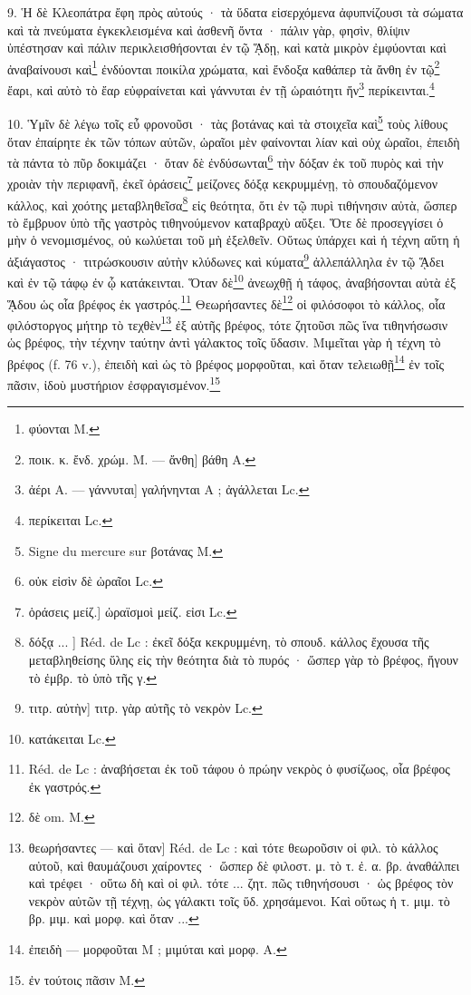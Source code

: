 \documentclass[a4paper, 11pt, oneside, polutonikogreek, french]{article}
\begin{document}
9. Ἡ δὲ Κλεοπάτρα ἔφη πρὸς αὐτούς · τὰ ὕδατα εἰσερχόμενα ἀφυπνίζουσι τὰ σώματα καὶ τὰ πνεύματα ἐγκεκλεισμένα καὶ ἀσθενῆ ὄντα · πάλιν γὰρ, φησὶν, θλίψιν ὑπέστησαν καὶ πάλιν περικλεισθήσονται ἐν τῷ ᾍδῃ, καὶ κατὰ μικρὸν ἐμφύονται καὶ ἀναβαίνουσι καὶ\footnote{φύονται M.} ἐνδύονται ποικίλα χρώματα, καὶ ἔνδοξα καθάπερ τὰ ἄνθη ἐν τῷ\footnote{ποικ. κ. ἔνδ. χρώμ. M. --- ἄνθη] βάθη A.} ἔαρι, καὶ αὐτὸ τὸ ἔαρ εὐφραίνεται καὶ γάννυται ἐν τῇ ὡραιότητι ἥν\footnote{ἀέρι A. --- γάννυται] γαλήνηνται A ; ἀγάλλεται Lc.} περίκεινται.\footnote{περίκειται Lc.}

10. Ὑμῖν δὲ λέγω τοῖς εὖ φρονοῦσι · τὰς βοτάνας καὶ τὰ στοιχεῖα καὶ\footnote{Signe du mercure sur βοτάνας M.} τοὺς λίθους ὅταν ἐπαίρητε ἐκ τῶν τόπων αὐτῶν, ὡραῖοι μὲν φαίνονται λίαν καὶ οὐχ ὡραῖοι, ἐπειδὴ τὰ πάντα τὸ πῦρ δοκιμάζει · ὅταν δὲ ἐνδύσωνται\footnote{οὐκ εἰσὶν δὲ ὠραῖοι Lc.} τὴν δόξαν ἐκ τοῦ πυρὸς καὶ τὴν χροιὰν τὴν περιφανῆ, ἐκεῖ ὁράσεις\footnote{ὁράσεις μείζ.] ὡραϊσμοὶ μείζ. εἰσι Lc.} μείζονες δόξᾳ κεκρυμμένῃ, τὸ σπουδαζόμενον κάλλος, καὶ χοότης μεταβληθεῖσα\footnote{δόξᾳ ... ] Réd. de Lc : ἐκεῖ δόξα κεκρυμμένη, τὸ σπουδ. κάλλος ἔχουσα τῆς μεταβληθείσης ὕλης εἰς τὴν θεότητα διὰ τὸ πυρός · ὥσπερ γὰρ τὸ βρέφος, ἤγουν τὸ ἐμβρ. τὸ ὑπὸ τῆς γ.} εἰς θεότητα, ὅτι ἐν τῷ πυρὶ τιθήνησιν αὐτὰ, ὥσπερ τὸ ἔμβρυον ὑπὸ τῆς γαστρὸς τιθηνούμενον καταβραχὺ αὔξει. Ὅτε δὲ προσεγγίσει ὁ μὴν ὁ νενομισμένος, οὐ κωλύεται τοῦ μὴ ἐξελθεῖν. Οὕτως ὑπάρχει καὶ ἡ τέχνη αὕτη ἡ ἀξιάγαστος · τιτρώσκουσιν αὐτὴν κλύδωνες καὶ κύματα\footnote{τιτρ. αὐτὴν] τιτρ. γὰρ αὐτῆς τὸ νεκρὸν Lc.} ἀλλεπάλληλα ἐν τῷ ᾍδει καὶ ἐν τῷ τάφῳ ἐν ᾧ κατάκεινται. Ὅταν δὲ\footnote{κατάκειται Lc.} ἀνεωχθῇ ἡ τάφος, ἀναβήσονται αὐτὰ ἐξ ᾍδου ὡς οἷα βρέφος ἐκ γαστρός.\footnote{Réd. de Lc : ἀναβήσεται ἐκ τοῦ τάφου ὁ πρώην νεκρὸς ὁ φυσίζωος, οἷα βρέφος ἐκ γαστρός.} Θεωρήσαντες δὲ\footnote{δὲ om. M.} οἱ φιλόσοφοι τὸ κάλλος, οἷα φιλόστοργος μήτηρ τὸ τεχθὲν\footnote{θεωρήσαντες --- καὶ ὅταν] Réd. de Lc : καὶ τότε θεωροῦσιν οἱ φιλ. τὸ κάλλος αὐτοῦ, καὶ θαυμάζουσι χαίροντες · ὥσπερ δὲ φιλοστ. μ. τὸ τ. ἐ. α. βρ. ἀναθάλπει καὶ τρέφει · οὕτω δὴ καὶ οἱ φιλ. τότε ... ζητ. πῶς τιθηνήσουσι · ὡς βρέφος τὸν νεκρὸν αὐτῶν τῇ τέχνῃ, ὡς γάλακτι τοῖς ὕδ. χρησάμενοι. Καὶ οὕτως ἡ τ. μιμ. τὸ βρ. μιμ. καὶ μορφ. καὶ ὅταν ...} ἐξ αὐτῆς βρέφος, τότε ζητοῦσι πῶς ἵνα τιθηνήσωσιν ὡς βρέφος, τὴν τέχνην ταύτην ἀντὶ γάλακτος τοῖς ὕδασιν. Μιμεῖται γὰρ ἡ τέχνη τὸ βρέφος (f. 76 v.), ἐπειδὴ καὶ ὡς τὸ βρέφος μορφοῦται, καὶ ὅταν τελειωθῇ\footnote{ἐπειδὴ --- μορφοῦται M ; μιμύται καὶ μορφ. A.} ἐν τοῖς πᾶσιν, ἰδοὺ μυστήριον ἐσφραγισμένον.\footnote{ἐν τούτοις πᾶσιν M.}
\end{document}
